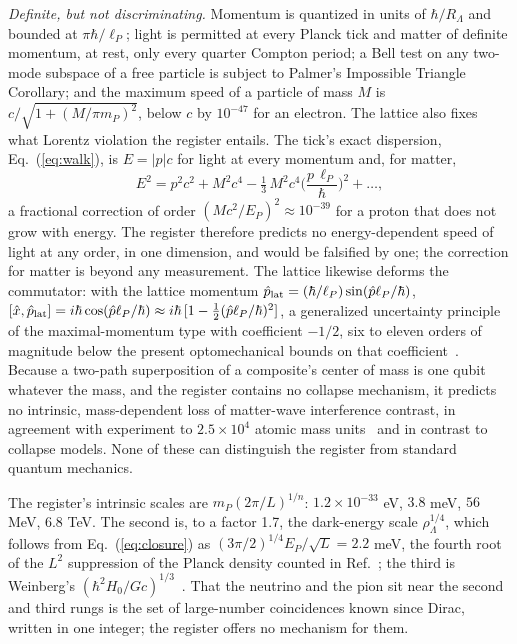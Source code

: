 \documentclass[aps,prd,twocolumn,superscriptaddress,nofootinbib]{revtex4-2}
\begin{document}
\textit{Definite, but not discriminating.} Momentum is quantized in units of $\hbar/R_\Lambda$ and bounded at $\pi\hbar/\ell_P$; light is permitted at every Planck tick and matter of definite momentum, at rest, only every quarter Compton period; a Bell test on any two-mode subspace of a free particle is subject to Palmer's Impossible Triangle Corollary; and the maximum speed of a particle of mass $M$ is $c/\sqrt{1 + (M/\pi m_P)^2}$, below $c$ by $10^{-47}$ for an electron. The lattice also fixes what Lorentz violation the register entails. The tick's exact dispersion, Eq.~(\ref{eq:walk}), is $E = |p|c$ for light at every momentum and, for matter,
\begin{equation}
E^2 = p^2c^2 + M^2c^4 - \tfrac{1}{3}\,M^2c^4\Big(\frac{p\,\ell_P}{\hbar}\Big)^2 + \dots ,
\label{eq:lattice}
\end{equation}
a fractional correction of order $(Mc^2/E_P)^2 \approx 10^{-39}$ for a proton that does not grow with energy. The register therefore predicts no energy-dependent speed of light at any order, in one dimension, and would be falsified by one; the correction for matter is beyond any measurement. The lattice likewise deforms the commutator: with the lattice momentum $\hat p_{\rm lat} = (\hbar/\ell_P)\sin(\hat p\ell_P/\hbar)$, $[\hat x,\hat p_{\rm lat}] = i\hbar\cos(\hat p\ell_P/\hbar) \approx i\hbar\,[1 - \tfrac12(\hat p\ell_P/\hbar)^2]$, a generalized uncertainty principle of the maximal-momentum type with coefficient $-1/2$, six to eleven orders of magnitude below the present optomechanical bounds on that coefficient~\cite{pikovski2012}. Because a two-path superposition of a composite's center of mass is one qubit whatever the mass, and the register contains no collapse mechanism, it predicts no intrinsic, mass-dependent loss of matter-wave interference contrast, in agreement with experiment to $2.5\times10^4$ atomic mass units~\cite{fein2019} and in contrast to collapse models. None of these can distinguish the register from standard quantum mechanics.

The register's intrinsic scales are $m_P(2\pi/L)^{1/n}$: $1.2\times10^{-33}$ eV, $3.8$ meV, $56$ MeV, $6.8$ TeV. The second is, to a factor 1.7, the dark-energy scale $\rho_\Lambda^{1/4}$, which follows from Eq.~(\ref{eq:closure}) as $(3\pi/2)^{1/4}E_P/\sqrt L = 2.2$ meV, the fourth root of the $L^2$ suppression of the Planck density counted in Ref.~\cite{korytko2026b}; the third is Weinberg's $(\hbar^2H_0/Gc)^{1/3}$~\cite{weinberg1972}. That the neutrino and the pion sit near the second and third rungs is the set of large-number coincidences known since Dirac, written in one integer; the register offers no mechanism for them.
\end{document}

